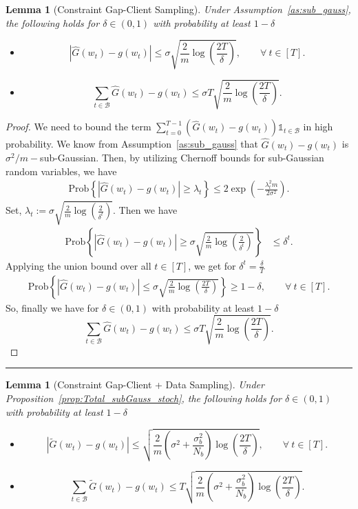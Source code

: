 \documentclass{article} %
\newtheorem{lemma}[]{Lemma}
\def\B{{\mathcal B}}
\begin{document}
\begin{lemma}[Constraint Gap-Client Sampling]
    \label{lem:constraint_gap}
    Under Assumption~\ref{as:sub_gauss}, the following holds for $\delta \in (0,1)$ with probability at least $1-\delta$
    \begin{itemize}
        \item $$
            |\hat{G}(w_t) - g(w_t)| \le
            \sigma \sqrt{\frac{2}{m} \log\left(\frac{2T}{\delta}\right)}
           , \qquad \forall \ t \in [T].$$
        \item $$\sum_{t \in \B}\hat{G}(w_t) - g(w_t) \le
            \sigma T \sqrt{\frac{2}{m} \log\left(\frac{2T}{\delta}\right)}.$$
    \end{itemize}
    
\end{lemma}
\begin{proof}
    We need to bound the term $\sum_{t=0}^{T-1}(\hat{G}(w_t) - g(w_t))\mathds{1}_{t \in \B}$ in high probability. We know from Assumption~\ref{as:sub_gauss} that $\hat{G}(w_t) - g(w_t)$ is $\sigma^2/m-$sub-Gaussian. Then, by utilizing Chernoff bounds for sub-Gaussian random variables, we have
    \begin{align*}
        \text{Prob}\left\{|\hat{G}(w_t) - g(w_t)| \geq \lambda_t \right\} \leq 2\exp\left(-\frac{\lambda_t^2m}{2\sigma^2}\right).
    \end{align*}
    Set, $\lambda_t := \sigma \sqrt{\frac{2}{m}\log\left(\frac{2}{\delta^t}\right)}$. Then we have
    \begin{align*}
        \text{Prob}\left\{| \hat{G}(w_t) - g(w_t)| \ge 
            \sigma \sqrt{\frac{2}{m} \log\left(\frac{2}{\delta^t}\right)} \right\}
        &\le \delta^t.
    \end{align*}
    Applying the union bound over all $t \in [T]$, we get for $\delta^t = \frac{\delta}{T}$
    \begin{align*}
        \text{Prob}\left\{
            |\hat{G}(w_t) - g(w_t)| \le
            \sigma \sqrt{\frac{2}{m} \log\left(\frac{2T}{\delta}\right)} \right\}
            \ge 1 - \delta, \qquad \forall \ t \in [T].
    \end{align*}
    So, finally we have for $\delta \in (0,1)$ with probability at least $1-\delta$
    $$\sum_{t \in \B}\hat{G}(w_t) - g(w_t) \le
            \sigma T \sqrt{\frac{2}{m} \log\left(\frac{2T}{\delta}\right)}.$$
\end{proof}
\hrule
\begin{lemma}[Constraint Gap-Client + Data Sampling]
    \label{lem:constraint_gap_both}
    Under Proposition~\ref{prop:Total_subGauss_stoch}, the following holds for $\delta \in (0,1)$ with probability at least $1-\delta$
    \begin{itemize}
        \item $$
            |\tilde{G}(w_t) - g(w_t)| \le \sqrt{\frac{2}{m}(\sigma^2+\frac{\sigma^2_b}{N_b}) \log\left(\frac{2T}{\delta}\right)} 
           , \qquad \forall \ t \in [T].$$
        \item $$\sum_{t \in \B}\tilde{G}(w_t) - g(w_t) \le T \sqrt{\frac{2}{m} (\sigma^2+\frac{\sigma^2_b}{N_b})\log\left(\frac{2T}{\delta}\right)}.$$
    \end{itemize}
\end{lemma}
\end{document}
